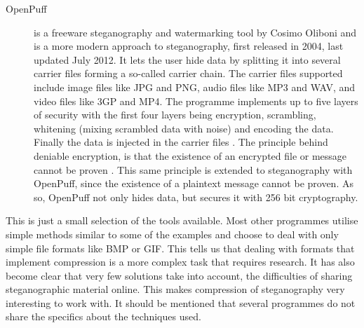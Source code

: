 \begin{description}
	\item[OpenPuff] is a freeware steganography and watermarking tool by Cosimo Oliboni and is a more modern approach to steganography, first released in 		2004, last updated July 2012. 
	It lets the user hide data by splitting it into several carrier files forming a so-called carrier chain. 
	The carrier files supported include image files like JPG and PNG, audio files like MP3 and WAV, and video files like 3GP and MP4.
	The programme implements up to five layers of security with the first four layers being encryption, scrambling, whitening (mixing scrambled data 			with noise) and encoding the data. 
	Finally the data is injected in the carrier files \citep{Oliboni2012}.
	The principle behind deniable encryption, is that the existence of an encrypted file or message cannot be proven \citep{Schneier2008}.
	This same principle is extended to steganography with OpenPuff, since the existence of a plaintext message cannot be proven.
	As so, OpenPuff not only hides data, but secures it with 256 bit cryptography.
\end{description}

This is just a small selection of the tools available. 
Most other programmes utilise simple methods similar to some of the examples and choose to deal with only simple file formats like BMP or GIF. 
This tells us that dealing with formats that implement compression is a more complex task that requires research.
It has also become clear that very few solutions take into account, the difficulties of sharing steganographic material online.
This makes compression of steganography very interesting to work with. 
It should be mentioned that several programmes do not share the specifics about the techniques used.